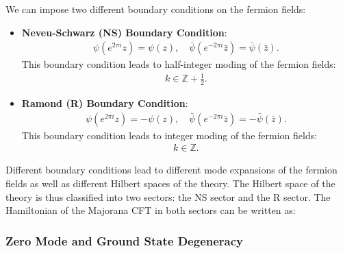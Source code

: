 We can impose two different boundary conditions on the fermion fields:
\begin{itemize}
  \item \textbf{Neveu-Schwarz (NS) Boundary Condition}:
        \begin{align}
          \psi(e^{2\pi i} z) = \psi(z), \quad \bar{\psi}(e^{-2\pi i} \bar{z}) = \bar{\psi}(\bar{z}).
        \end{align}
        This boundary condition leads to half-integer moding of the fermion fields:
        \begin{align}
          k \in \mathbb{Z} + \frac{1}{2}.
        \end{align}
      \item \textbf{Ramond (R) Boundary Condition}: 
        \begin{align}
          \psi(e^{2\pi i} z) = - \psi(z), \quad \bar{\psi}(e^{-2\pi i} \bar{z}) =- \bar{\psi}(\bar{z}).
        \end{align}
        This boundary condition leads to integer moding of the fermion fields:
        \begin{align}
          k \in \mathbb{Z}.
        \end{align}
\end{itemize}
Different boundary conditions lead to different mode expansions of the fermion fields as well as different Hilbert spaces of the theory. The Hilbert space of the theory is thus classified into two sectors: the NS sector and the R sector.
The Hamiltonian of the Majorana CFT in both sectors can be written as:

\subsubsection{Zero Mode and Ground State Degeneracy}

